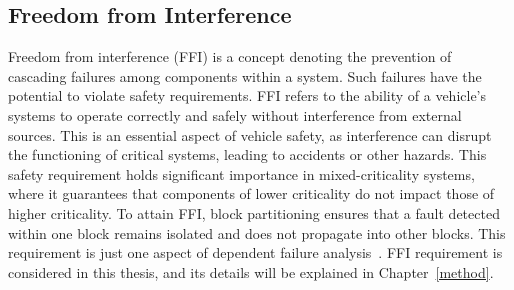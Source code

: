     

    
    
    
    
    
    \subsection{Freedom from Interference}
    
    
    Freedom from interference (FFI) is a concept denoting the prevention of cascading failures among components within a system. Such failures have the potential to violate safety requirements. FFI refers to the ability of a vehicle's systems to operate correctly and safely without interference from external sources. This is an essential aspect of vehicle safety, as interference can disrupt the functioning of critical systems, leading to accidents or other hazards.
    This safety requirement holds significant importance in mixed-criticality systems, where it guarantees that components of lower criticality do not impact those of higher criticality.
    To attain FFI, block partitioning ensures that a fault detected within one block remains isolated and does not propagate into other blocks. This requirement is just one aspect of dependent failure analysis~\cite{askaripoor2023designer, iso26262, askaripoor2022architecture}. FFI requirement is considered in this thesis, and its details will be explained in Chapter~\ref{method}.
   
